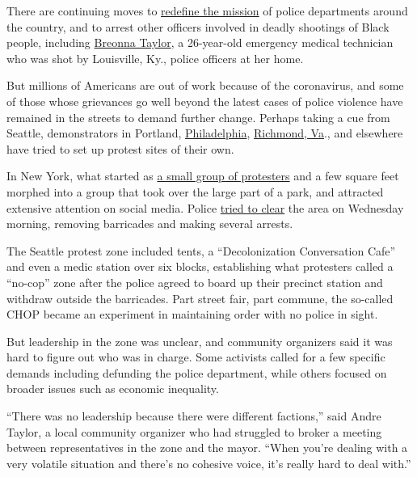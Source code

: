 There are continuing moves to
\href{https://www.nytimes.com/2020/06/05/us/defund-police-floyd-protests.html}{redefine
the mission} of police departments around the country, and to arrest
other officers involved in deadly shootings of Black people, including
\href{https://www.nytimes.com/article/breonna-taylor-police.html}{Breonna
Taylor}, a 26-year-old emergency medical technician who was shot by
Louisville, Ky., police officers at her home.

But millions of Americans are out of work because of the coronavirus,
and some of those whose grievances go well beyond the latest cases of
police violence have remained in the streets to demand further change.
Perhaps taking a cue from Seattle, demonstrators in Portland,
\href{https://itsgoingdown.org/hahnemann-hospital-report/}{Philadelphia},
\href{https://www.nytimes.com/2020/06/23/style/statue-richmond-lee.html}{Richmond,
Va}., and elsewhere have tried to set up protest sites of their own.

In New York, what started as
\href{https://www.nytimes.com/2020/06/28/nyregion/occupy-city-hall-nyc.html}{a
small group of protesters} and a few square feet morphed into a group
that took over the large part of a park, and attracted extensive
attention on social media. Police
\href{https://www.nydailynews.com/news/politics/ny-occupy-city-hall-nypd-clash-20200701-wxq7mxffqrgt5mqxodvqpqrgka-story.html}{tried
to clear} the area on Wednesday morning, removing barricades and making
several arrests.

The Seattle protest zone included tents, a ``Decolonization Conversation
Cafe'' and even a medic station over six blocks, establishing what
protesters called a ``no-cop'' zone after the police agreed to board up
their precinct station and withdraw outside the barricades. Part street
fair, part commune, the so-called CHOP became an experiment in
maintaining order with no police in sight.

But leadership in the zone was unclear, and community organizers said it
was hard to figure out who was in charge. Some activists called for a
few specific demands including defunding the police department, while
others focused on broader issues such as economic inequality.

``There was no leadership because there were different factions,'' said
Andre Taylor, a local community organizer who had struggled to broker a
meeting between representatives in the zone and the mayor. ``When you're
dealing with a very volatile situation and there's no cohesive voice,
it's really hard to deal with.''

